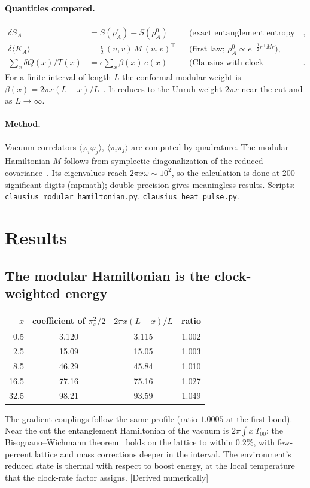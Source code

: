 \documentclass[11pt]{article}
\newcommand{\st}[1]{\textsf{\small[#1]}}
\begin{document}
\paragraph{Quantities compared.}
\begin{align}
\delta S_A &= S(\rho_A^{\epsilon})-S(\rho_A^{0}) && \text{(exact entanglement entropy change)},\\
\delta\langle K_A\rangle &= \tfrac{\epsilon}{2}\,(u,v)\,M\,(u,v)^{\!\top} && \text{(first law; $\rho_A^0\propto e^{-\frac12 r^\top Mr}$)},\\
\textstyle\sum_x \delta Q(x)/T(x) &= \textstyle\epsilon\sum_x\beta(x)\,e(x) && \text{(Clausius with clock temperature)}.
\end{align}
For a finite interval of length $L$ the conformal modular weight is $\beta(x)=2\pi x(L-x)/L$~\cite{CasiniHuerta2011}. It reduces to the Unruh weight $2\pi x$ near the cut and as $L\to\infty$.

\paragraph{Method.} Vacuum correlators $\langle\varphi_i\varphi_j\rangle$, $\langle\pi_i\pi_j\rangle$ are computed by quadrature. The modular Hamiltonian $M$ follows from symplectic diagonalization of the reduced covariance~\cite{Peschel2003}. Its eigenvalues reach $2\pi x\omega\sim10^2$, so the calculation is done at 200 significant digits (mpmath); double precision gives meaningless results. Scripts: \texttt{clausius\_modular\_hamiltonian.py}, \texttt{clausius\_heat\_pulse.py}.

\section{Results}

\subsection{The modular Hamiltonian is the clock-weighted energy}

\begin{center}
\begin{tabular}{@{}rccc@{}}
\toprule
$x$ & coefficient of $\pi_x^2/2$ & $2\pi x(L-x)/L$ & ratio \\
\midrule
0.5 & 3.120 & 3.115 & 1.002 \\
2.5 & 15.09 & 15.05 & 1.003 \\
8.5 & 46.29 & 45.84 & 1.010 \\
16.5 & 77.16 & 75.16 & 1.027 \\
32.5 & 98.21 & 93.59 & 1.049 \\
\bottomrule
\end{tabular}
\end{center}
The gradient couplings follow the same profile (ratio $1.0005$ at the first bond). Near the cut the entanglement Hamiltonian of the vacuum is $2\pi\int x\,T_{00}$: the Bisognano--Wichmann theorem~\cite{BW1976} holds on the lattice to within $0.2\%$, with few-percent lattice and mass corrections deeper in the interval. The environment's reduced state is thermal with respect to boost energy, at the local temperature that the clock-rate factor assigns. \st{Derived numerically}
\end{document}
